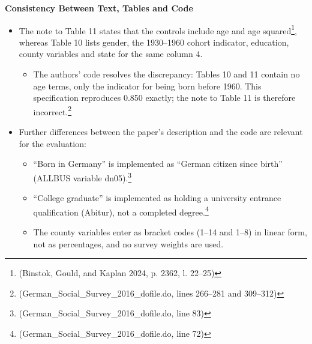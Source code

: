 \par\textbf{Consistency Between Text, Tables and Code}\par

\begin{itemize}
\item
  The note to Table 11 states that the controls include age and age squared\footnote{(Binstok, Gould, and Kaplan 2024, p. 2362, l. 22--25)}, whereas Table 10 lists gender, the 1930--1960 cohort indicator, education, county variables and state for the same column 4.

  \begin{itemize}
  \item
    The authors' code resolves the discrepancy: Tables 10 and 11 contain no age terms, only the indicator for being born before 1960. This specification reproduces 0.850 exactly; the note to Table 11 is therefore incorrect.\footnote{(German\_Social\_Survey\_2016\_dofile.do, lines 266--281 and 309--312)}
  \end{itemize}
\item
  Further differences between the paper's description and the code are relevant for the evaluation:

  \begin{itemize}
  \item
    ``Born in Germany'' is implemented as ``German citizen since birth'' (ALLBUS variable dn05).\footnote{(German\_Social\_Survey\_2016\_dofile.do, line 83)}
  \item
    ``College graduate'' is implemented as holding a university entrance qualification (Abitur), not a completed degree.\footnote{(German\_Social\_Survey\_2016\_dofile.do, line 72)}
  \item
    The county variables enter as bracket codes (1--14 and 1--8) in linear form, not as percentages, and no survey weights are used.
  \end{itemize}
\end{itemize}

